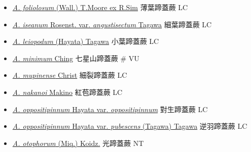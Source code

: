 \begin{itemize}
\begin{itemize}
        \item[] \href{http://www.theplantlist.org/tpl1.1/search?q=Athyrium+foliolosum}{\textit{A. foliolosum} (Wall.) T.Moore ex R.Sim}   薄葉蹄蓋蕨   LC
        \item[] \href{http://www.theplantlist.org/tpl1.1/search?q=Athyrium+iseanum+var.+angustisectum}{\textit{A. iseanum} Rosenst. var. \textit{angustisectum} Tagawa}  
                                        細葉蹄蓋蕨   LC
        \item[] \href{http://www.theplantlist.org/tpl1.1/search?q=Athyrium+leiopodum}{\textit{A. leiopodum} (Hayata) Tagawa}   小葉蹄蓋蕨   LC
        \item[] \href{http://www.theplantlist.org/tpl1.1/search?q=Athyrium+minimum}{\textit{A. minimum} Ching}   七星山蹄蓋蕨  \# VU
        \item[] \href{http://www.theplantlist.org/tpl1.1/search?q=Athyrium+mupinense}{\textit{A. mupinense} Christ}   細裂蹄蓋蕨   LC
        \item[] \href{http://www.theplantlist.org/tpl1.1/search?q=Athyrium+nakanoi}{\textit{A. nakanoi} Makino}   紅苞蹄蓋蕨   LC
        \item[] \href{http://www.theplantlist.org/tpl1.1/search?q=Athyrium+oppositipinnum+var.+oppositipinnum}{\textit{A. oppositipinnum} Hayata var. \textit{oppositipinnum}}  
                                        對生蹄蓋蕨   LC
        \item[] \href{http://www.theplantlist.org/tpl1.1/search?q=Athyrium+oppositipinnum+var.+pubescens}{\textit{A. oppositipinnum} Hayata var. \textit{pubescens} (Tagawa) Tagawa}  
                                        逆羽蹄蓋蕨   LC
        \item[] \href{http://www.theplantlist.org/tpl1.1/search?q=Athyrium+otophorum}{\textit{A. otophorum} (Miq.) Koidz.}   光蹄蓋蕨   NT

\end{itemize}
\end{itemize}
